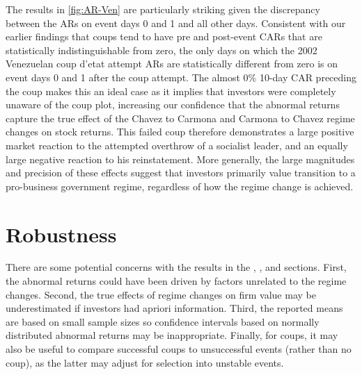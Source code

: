 \documentclass[12pt,final,fleqn]{article}
\theoremstyle{plain}
\begin{document}
The results in \autoref{fig:AR-Ven} are particularly striking given the discrepancy between the ARs on event days 0 and 1 and all other days. Consistent with our earlier findings that coups tend to have pre and post-event CARs that are statistically indistinguishable from zero, the only days on which the 2002 Venezuelan coup d'etat attempt ARs are statistically different from zero is on event days 0 and 1 after the coup attempt. The almost 0\% 10-day CAR preceding the coup makes this an ideal case as it implies that investors were completely unaware of the coup plot, increasing our confidence that the abnormal returns capture the true effect of the Chavez to Carmona and Carmona to Chavez regime changes on stock returns. This failed coup therefore demonstrates a large positive market reaction to the attempted overthrow of a socialist leader, and an equally large negative reaction to his reinstatement. More generally, the large magnitudes and precision of these effects suggest that  investors primarily value transition to a pro-business government regime, regardless of how the regime change is achieved. 


\section{Robustness} \label{subsec: Robustness}

There are some potential concerns with the results in the , , and  sections. First, the abnormal returns could have been driven by factors unrelated to the regime changes.  Second, the true effects of regime changes on firm value may be underestimated if investors had apriori information. Third, the reported means are based on small sample sizes so confidence intervals based on normally distributed abnormal returns may be inappropriate. Finally, for coups, it may also be useful to compare successful coups to  unsuccessful events (rather than no coup), as the latter may adjust for selection into unstable events.
\end{document}
